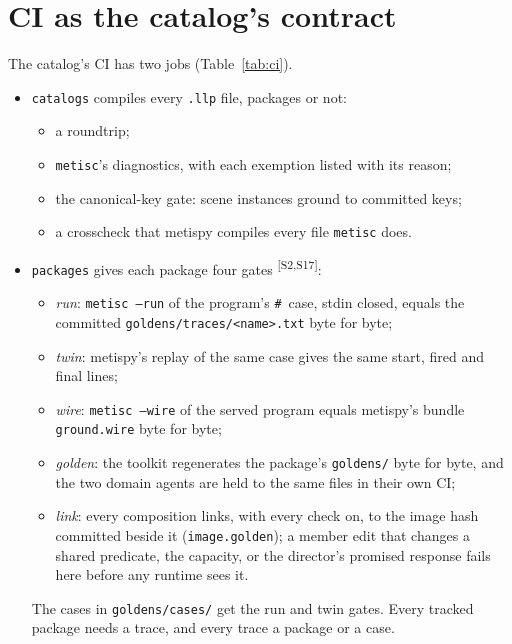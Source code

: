 \documentclass[11pt]{article}
\newcommand{\metisc}{\texttt{metisc}}
\newcommand{\src}[1]{\textsuperscript{[#1]}}
\begin{document}
\section{CI as the catalog's contract}\label{sec:ci}

The catalog's CI has two jobs (Table~\ref{tab:ci}).
\begin{itemize}[nosep]
\item \texttt{catalogs} compiles every \texttt{.llp} file, packages or
  not:
  \begin{itemize}[nosep]
  \item a roundtrip;
  \item \metisc's diagnostics, with each exemption listed with its reason;
  \item the canonical-key gate: scene instances ground to committed keys;
  \item a crosscheck that metispy compiles every file \metisc{} does.
  \end{itemize}
\item \texttt{packages} gives each package four gates \src{S2,S17}:
  \begin{itemize}[nosep]
  \item \emph{run}: \texttt{metisc --run} of the program's
    \texttt{\#}~case, stdin closed, equals the committed
    \texttt{goldens/traces/<name>.txt} byte for byte;
  \item \emph{twin}: metispy's replay of the same case gives the same
    start, fired and final lines;
  \item \emph{wire}: \texttt{metisc --wire} of the served program equals
    metispy's bundle \texttt{ground.wire} byte for byte;
  \item \emph{golden}: the toolkit regenerates the package's
    \texttt{goldens/} byte for byte, and the two domain agents are held to
    the same files in their own CI;
  \item \emph{link}: every composition links, with every check on, to the
    image hash committed beside it (\texttt{image.golden}); a member
    edit that changes a shared predicate, the capacity, or the director's
    promised response fails here before any runtime sees it.
  \end{itemize}
  The cases in \texttt{goldens/cases/} get the run and twin gates.
  Every tracked package needs a trace, and every trace a package or a
  case.
\end{itemize}
\end{document}
